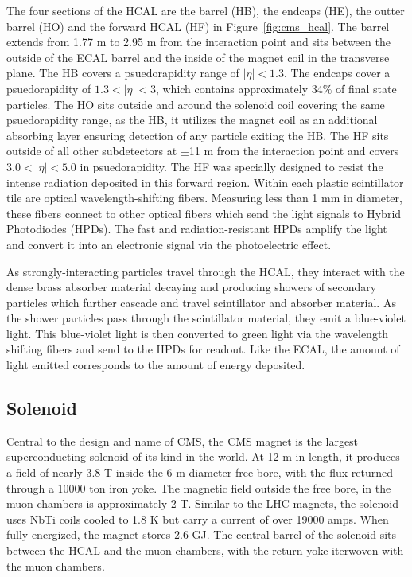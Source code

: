 The four sections of the HCAL are the barrel (HB), the endcaps (HE), the outter barrel (HO) and the forward HCAL (HF) in Figure~\ref{fig:cms_hcal}. The barrel extends from 1.77 m to 2.95 m from the interaction point and
sits between the outside of the ECAL barrel and the inside of the magnet coil in the transverse plane. The HB covers a psuedorapidity range of $|\eta| < 1.3$.
The endcaps cover a psuedorapidity of $1.3 < |\eta| < 3$, which contains approximately 34$\%$ of final state particles. The HO sits outside and around the solenoid coil covering the same psuedorapidity range,
as the HB, it utilizes the magnet coil as an additional absorbing layer ensuring detection of any particle exiting the HB. The HF sits outside of all other subdetectors at $\pm$11 m from the interaction point
and covers $3.0 < |\eta| < 5.0$ in psuedorapidity. The HF was specially designed to resist the intense radiation deposited in this forward region. Within each plastic scintillator tile are optical wavelength-shifting fibers.
Measuring less than 1 mm in diameter, these fibers connect to other optical fibers which send the light signals to Hybrid Photodiodes (HPDs). The fast and radiation-resistant HPDs amplify the light and convert it
into an electronic signal via the photoelectric effect.

As strongly-interacting particles travel through the HCAL, they interact with the dense brass absorber material decaying and producing showers of secondary particles which further cascade and travel scintillator and absorber material.
As the shower particles pass through the scintillator material, they emit a blue-violet light. This blue-violet light is then converted to green light via the wavelength shifting fibers and send to the HPDs for readout. Like the ECAL,
the amount of light emitted corresponds to the amount of energy deposited. 

\subsection{Solenoid}
Central to the design and name of CMS, the CMS magnet is the largest superconducting solenoid of its kind in the world.
At 12 m in length, it produces a field of nearly 3.8 T inside the 6 m diameter free bore, with the flux returned through a 10000 ton iron yoke.
The magnetic field outside the free bore, in the muon chambers is approximately 2 T.  
Similar to the LHC magnets, the solenoid uses NbTi coils cooled to 1.8 K but carry a current of over 19000 amps. When fully energized, the magnet
stores 2.6 GJ. The central barrel of the solenoid sits between the HCAL and the muon chambers, with the return yoke iterwoven with the muon chambers.

